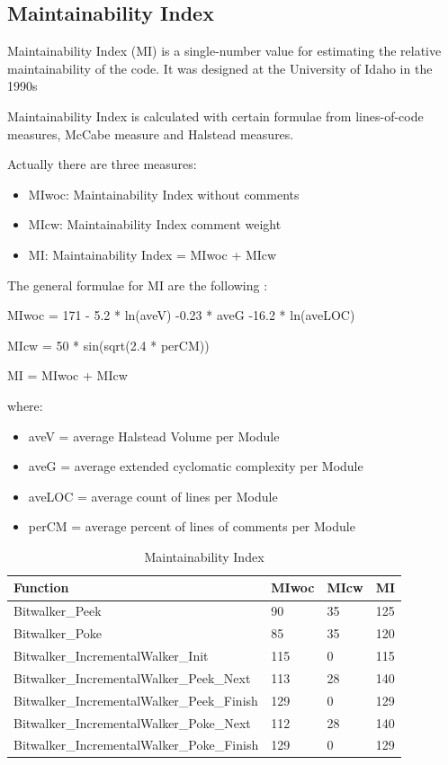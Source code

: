 \subsection{Maintainability Index}
Maintainability Index (MI) is a single-number value for estimating the relative maintainability of the code. It was designed at the University of Idaho in the 1990s \citep{MI_idaho}

Maintainability Index is calculated with certain formulae from lines-of-code measures, McCabe measure and Halstead measures.

Actually there are three measures:
\begin{itemize}
\item MIwoc: Maintainability Index without comments
\item MIcw: Maintainability Index comment weight
\item MI: Maintainability Index = MIwoc + MIcw
\end{itemize}

The general formulae for MI are the following \citep{MI_IEEE}:

MIwoc = 171 - 5.2 * ln(aveV) -0.23 * aveG -16.2 * ln(aveLOC)

MIcw = 50 * sin(sqrt(2.4 * perCM))

MI = MIwoc + MIcw

where:
\begin{itemize}
\item aveV = average Halstead Volume per Module
\item aveG = average extended cyclomatic complexity per Module
\item aveLOC = average count of lines per Module
\item perCM = average percent of lines of comments per Module
\end{itemize}

\begin{longtable}{||p{}|p{}|p{}|p{}||}
  \caption{Maintainability Index}\\
    \hline\hline
    \textbf{Function} &\textbf{MIwoc} & \textbf{MIcw} & \textbf{MI}\\
    \hline\hline
    \endhead
    \hline\hline
    \endfoot
    Bitwalker\_Peek & 90 & 35 & 125 
    \\
    \hline
    Bitwalker\_Poke & 85 & 35 & 120 
    \\
    \hline
    Bitwalker\_IncrementalWalker\_Init & 115 & 0 & 115  
    \\
    \hline
    Bitwalker\_IncrementalWalker\_Peek\_Next & 113 & 28 & 140  
    \\
    \hline
    Bitwalker\_IncrementalWalker\_Peek\_Finish & 129 & 0 & 129  
    \\
    \hline
    Bitwalker\_IncrementalWalker\_Poke\_Next & 112 & 28 & 140  
    \\
    \hline
    Bitwalker\_IncrementalWalker\_Poke\_Finish & 129 & 0 & 129  
    \\
    \hline
   \end{longtable}

